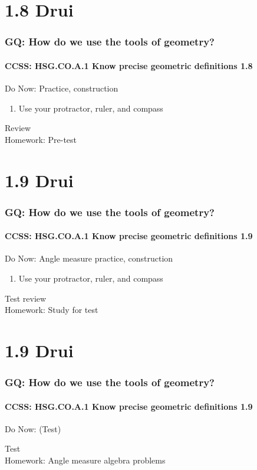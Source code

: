 \documentclass{beamer}
\begin{document}
\section{1.8 Drui}
  \frame
  {
    \frametitle{GQ: How do we use the tools of geometry?}
    \framesubtitle{CCSS: HSG.CO.A.1 Know precise geometric definitions  \alert{1.8}}

    \begin{block}{Do Now: Practice, construction}
    \begin{enumerate}
        \item Use your protractor, ruler, and compass
    \end{enumerate}
    \end{block}
    Review\\
    \vspace{1cm}
    Homework: Pre-test
  }

\section{1.9 Drui}
  \frame
  {
    \frametitle{GQ: How do we use the tools of geometry?}
    \framesubtitle{CCSS: HSG.CO.A.1 Know precise geometric definitions  \alert{1.9}}

    \begin{block}{Do Now: Angle measure practice, construction}
    \begin{enumerate}
        \item Use your protractor, ruler, and compass
    \end{enumerate}
    \end{block}
    Test review\\
    \vspace{1cm}
    Homework: Study for test
  }

  \section{1.9 Drui}
    \frame
    {
      \frametitle{GQ: How do we use the tools of geometry?}
      \framesubtitle{CCSS: HSG.CO.A.1 Know precise geometric definitions  \alert{1.9}}

      \begin{block}{Do Now: (Test)}
      \end{block}
      Test\\
      \vspace{1cm}
      Homework: Angle measure algebra problems
    }
\end{document}
